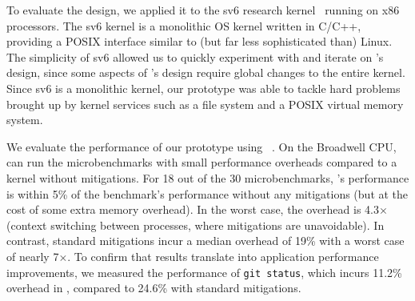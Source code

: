To evaluate the \sys design, we applied it to the sv6 research
kernel~\cite{clements:sc} running on x86 processors.  The sv6 kernel
is a monolithic OS kernel written in C/C++, providing a POSIX
interface similar to (but far less sophisticated than) Linux.  The
simplicity of sv6 allowed us to quickly experiment with and iterate on
\sys's design, since some aspects of \sys's design require global
changes to the entire kernel.  Since sv6 is a monolithic kernel,
our prototype was able to tackle hard problems brought up by kernel
services such as a file system and a POSIX virtual memory system.

We evaluate the performance of our \sys prototype using
\bench~\cite{lebench}.
On the Broadwell CPU, \sys can run the \bench microbenchmarks with small performance
overheads compared to a kernel without mitigations.  For 18 out of
the 30 \bench microbenchmarks, \sys's performance is within 5\% of the
benchmark's performance without any mitigations (but at the cost of some
extra memory overhead). In the worst case, the overhead is 4.3$\times$
(context switching between processes, where mitigations are unavoidable).
In contrast, standard mitigations incur a median overhead of 19\% with
a worst case of nearly 7$\times$.  To confirm that \bench results translate
into application performance improvements, we measured the performance
of \texttt{git status}, which incurs 11.2\% overhead in \sys, compared
to 24.6\% with standard mitigations.



